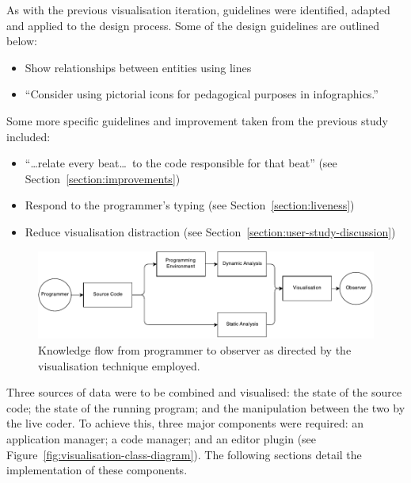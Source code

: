 As with the previous visualisation iteration, guidelines were identified, adapted and applied to the design process. Some of the design guidelines are outlined below:

\begin{itemize}
\item Show relationships between entities using lines \cite[p.~183]{Ware2013a}~
\item ``Consider using pictorial icons for pedagogical purposes in infographics.'' \cite[p.~320]{Ware2013a}~
\end{itemize}

Some more specific guidelines and improvement taken from the previous study included:

\begin{itemize}
\item ``\ldots relate every beat\ldots~to the code responsible for that beat'' (see Section~\ref{section:improvements})~
\item Respond to the programmer's typing (see Section~\ref{section:liveness})~
\item Reduce visualisation distraction (see Section~\ref{section:user-study-discussion})~

\end{itemize}



\begin{figure}
  \centering \includegraphics[width=\columnwidth]{../images/diagrams/knowledge-flow-refined.pdf}
  \caption{Knowledge flow from programmer to observer as directed by the visualisation technique employed.}
\label{fig:knowledge-flow-refined}
\end{figure}

Three sources of data were to be combined and visualised: the state of the source code; the state of the running program; and the manipulation between the two by the live coder. To achieve this, three major components were required: an application manager; a code manager; and an editor plugin (see Figure~\ref{fig:visualisation-class-diagram}). The following sections detail the implementation of these components.

